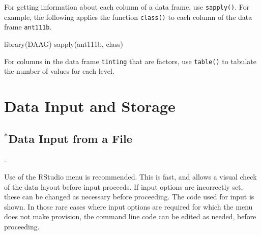 \documentclass{tufte-book}\usepackage[]{graphicx}\usepackage[]{color}
\begin{document}
\begin{enumerate}
For getting information about each column of a data frame, use
\texttt{sapply()}.  For example, the following applies the function
\texttt{class()} to each column of the data frame \texttt{ant111b}.
\begin{Schunk}
\begin{Sinput}
library(DAAG)
sapply(ant111b, class)
\end{Sinput}
\end{Schunk}
For columns in the data frame \texttt{tinting} that are factors, use
\texttt{table()} to tabulate the number of values for each level.
\end{enumerate}
%

\cleartooddpage

\chapter{Data Input and Storage}\label{ch:input}





\section{$^*$Data Input from a File}\label{sec:entry}

.

Use of the RStudio menu is recommended.  This is fast, and allows
a visual check of the data layout before input proceeds.  If input
options are incorrectly set, these can be changed as necessary
before proceeding. The code used for input is shown. In those rare
cases where input options are required for which the menu does not 
make provision, the command line code can be edited as needed,
before proceeding.

\end{document}

